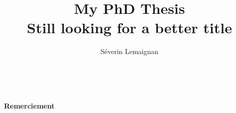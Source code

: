 \documentclass[a4paper,12pt]{book}
\title{
	\vspace{3em}
	\LARGE{\textbf{My PhD Thesis}}\\[1cm]
	\large{Still looking for a better title}\\[1cm]
	\vfill
}
\author{
Séverin Lemaignan
}
\begin{document}

\maketitle

\tableofcontents

\clearpage
\listoffixmes

\clearpage
\thispagestyle{empty}
~
\vfill
\begin{center}
    \LARGE{\textbf{Remerciement}}
\end{center}

\vspace{3em}

\vfill










\printglossaries





\end{document}
